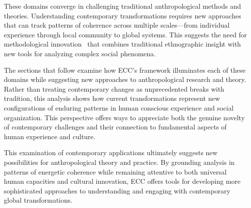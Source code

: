 These domains converge in challenging traditional anthropological methods and theories. Understanding contemporary transformations requires new approaches that can track patterns of coherence across multiple scales---from individual experience through local community to global systems. This suggests the need for methodological innovation~ that combines traditional ethnographic insight with new tools for analyzing complex social phenomena.

The sections that follow examine how ECC's framework illuminates each of these domains while suggesting new approaches to anthropological research and theory. Rather than treating contemporary changes as unprecedented breaks with tradition, this analysis shows how current transformations represent new configurations of enduring patterns in human conscious experience and social organization. This perspective offers ways to appreciate both the genuine novelty of contemporary challenges and their connection to fundamental aspects of human experience and culture.

This examination of contemporary applications ultimately suggests new possibilities for anthropological theory and practice. By grounding analysis in patterns of energetic coherence while remaining attentive to both universal human capacities and cultural innovation, ECC offers tools for developing more sophisticated approaches to understanding and engaging with contemporary global transformations.








